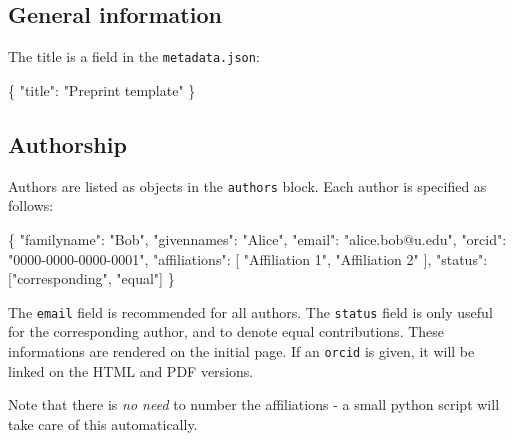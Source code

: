 \documentclass[11pt]{article}
\newenvironment{Shaded}{\begin{snugshade}}{\end{snugshade}}
\newcommand{\DataTypeTok}[1]{\textcolor[rgb]{0.13,0.29,0.53}{#1}}
\newcommand{\StringTok}[1]{\textcolor[rgb]{0.31,0.60,0.02}{#1}}
\newcommand{\OtherTok}[1]{\textcolor[rgb]{0.56,0.35,0.01}{#1}}
\newcommand{\FunctionTok}[1]{\textcolor[rgb]{0.00,0.00,0.00}{#1}}
\begin{document}
\hypertarget{general-information}{%
\subsection{General information}\label{general-information}}

The title is a field in the \texttt{metadata.json}:

\begin{Shaded}
\begin{Highlighting}[]
\FunctionTok{\{}
    \DataTypeTok{"title"}\FunctionTok{:} \StringTok{"Preprint template"}
\FunctionTok{\}}
\end{Highlighting}
\end{Shaded}

\hypertarget{authorship}{%
\subsection{Authorship}\label{authorship}}

Authors are listed as objects in the \texttt{authors} block. Each author
is specified as follows:

\begin{Shaded}
\begin{Highlighting}[]
\FunctionTok{\{}
      \DataTypeTok{"familyname"}\FunctionTok{:} \StringTok{"Bob"}\FunctionTok{,}
      \DataTypeTok{"givennames"}\FunctionTok{:} \StringTok{"Alice"}\FunctionTok{,}
      \DataTypeTok{"email"}\FunctionTok{:} \StringTok{"alice.bob@u.edu"}\FunctionTok{,}
      \DataTypeTok{"orcid"}\FunctionTok{:} \StringTok{"0000{-}0000{-}0000{-}0001"}\FunctionTok{,}
      \DataTypeTok{"affiliations"}\FunctionTok{:} \OtherTok{[}
        \StringTok{"Affiliation 1"}\OtherTok{,}
        \StringTok{"Affiliation 2"}
      \OtherTok{]}\FunctionTok{,}
      \DataTypeTok{"status"}\FunctionTok{:} \OtherTok{[}\StringTok{"corresponding"}\OtherTok{,} \StringTok{"equal"}\OtherTok{]}
    \FunctionTok{\}}
\end{Highlighting}
\end{Shaded}

The \texttt{email} field is recommended for all authors. The
\texttt{status} field is only useful for the corresponding author, and
to denote equal contributions. These informations are rendered on the
initial page. If an \texttt{orcid} is given, it will be linked on the
HTML and PDF versions.

Note that there is \emph{no need} to number the affiliations - a small
python script will take care of this automatically.
\end{document}
